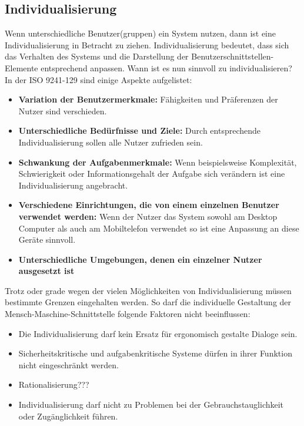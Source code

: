\subsection{Individualisierung}
Wenn unterschiedliche Benutzer(gruppen) ein System nutzen, dann ist eine Individualisierung in Betracht zu ziehen. Individualisierung bedeutet, dass sich das Verhalten des Systems und die Darstellung der Benutzerschnittstellen-Elemente entsprechend anpassen. Wann ist es nun sinnvoll zu individualisieren? In der ISO 9241-129 \cite{ISO9241-129} sind einige Aspekte aufgelistet:
\begin{itemize}
\item \textbf{Variation der Benutzermerkmale:} Fähigkeiten und Präferenzen der Nutzer sind verschieden.
\item \textbf{Unterschiedliche Bedürfnisse und Ziele:} Durch entsprechende Individualisierung sollen alle Nutzer zufrieden sein.
\item \textbf{Schwankung der Aufgabenmerkmale:} Wenn beispielsweise Komplexität, Schwierigkeit oder Informationsgehalt der Aufgabe sich verändern ist eine Individualisierung angebracht.
\item \textbf{Verschiedene Einrichtungen, die von einem einzelnen Benutzer verwendet werden:} Wenn der Nutzer das System sowohl am Desktop Computer als auch am Mobiltelefon verwendet so ist eine Anpassung an diese Geräte sinnvoll.
\item \textbf{Unterschiedliche Umgebungen, denen ein einzelner Nutzer ausgesetzt ist}
\end{itemize}
Trotz oder grade wegen der vielen Möglichkeiten von Individualisierung müssen bestimmte Grenzen eingehalten werden. So darf die individuelle Gestaltung der Mensch-Maschine-Schnittstelle folgende Faktoren nicht beeinflussen:
\begin{itemize}
\item Die Individualisierung darf kein Ersatz für ergonomisch gestalte Dialoge sein.
\item Sicherheitskritische und aufgabenkritische Systeme dürfen in ihrer Funktion nicht eingeschränkt werden.
\item Rationalisierung???
\item Individualisierung darf nicht zu Problemen bei der Gebrauchstauglichkeit oder Zugänglichkeit führen.
\end{itemize}

